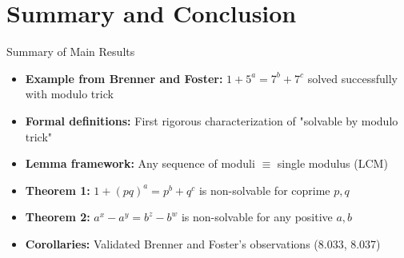 \section{Summary and Conclusion}

\begin{frame}{Summary of Main Results}
    \begin{itemize}
        \item \textbf{Example from Brenner and Foster:} $1+5^a = 7^b+7^c$ solved successfully with modulo trick
        
        \item \textbf{Formal definitions:} First rigorous characterization of "solvable by modulo trick"
        
        \item \textbf{Lemma framework:} Any sequence of moduli $\equiv$ single modulus (LCM)
        
        \item \textbf{Theorem 1:} $1+(pq)^a = p^b+q^c$ is non-solvable for coprime $p,q$
        
        \item \textbf{Theorem 2:} $a^x-a^y = b^z-b^w$ is non-solvable for any positive $a,b$
        
        \item \textbf{Corollaries:} Validated Brenner and Foster's observations (8.033, 8.037)
    \end{itemize}
\end{frame}

